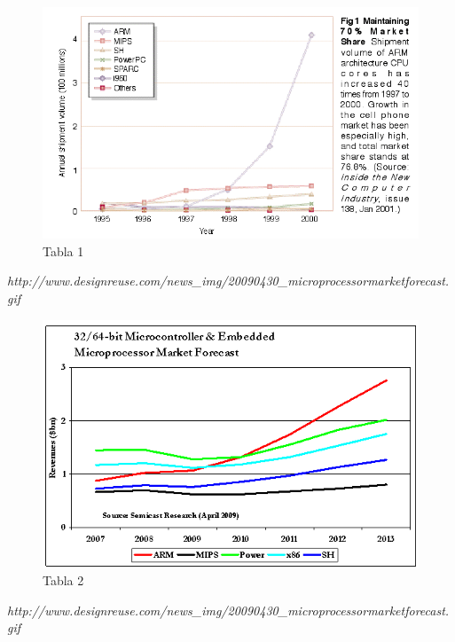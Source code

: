 \begin{figure}[H]
\centering
\includegraphics[scale=0.4]{tablaarm1}
\caption{Tabla 1}\label{fig:tablaarm1}
\end{figure}
{\em http://www.design\-reuse.com/news\_img/20090430\_microprocessor\-market\-forecast.gif}

\begin{figure}[H]
\centering
\includegraphics[scale=0.4]{tablaarm2}
\caption{Tabla 2}\label{fig:tablaarm2}
\end{figure}
{\em http://www.design\-reuse.com/news\_img/20090430\_microprocessor\-market\-forecast.gif}

